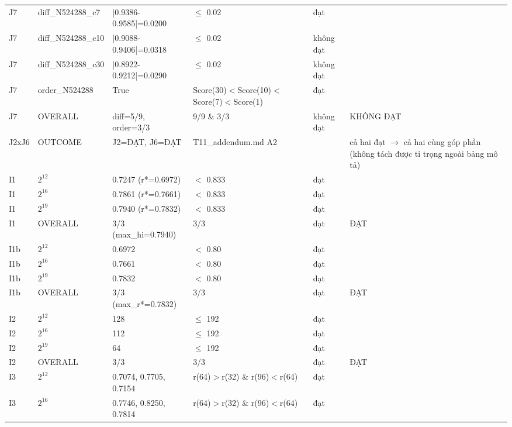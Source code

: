 \begin{longtable}{p{0.8cm}p{2.2cm}p{3.9cm}p{3.2cm}p{1.1cm}p{2.4cm}}
J7 & diff\_\allowbreak{}N524288\_\allowbreak{}c7 & |0.9386-0.9585|=\allowbreak{}0.0200 & $\le$\allowbreak{} 0.02 & đạt &  \\
J7 & diff\_\allowbreak{}N524288\_\allowbreak{}c10 & |0.9088-0.9406|=\allowbreak{}0.0318 & $\le$\allowbreak{} 0.02 & không đạt &  \\
J7 & diff\_\allowbreak{}N524288\_\allowbreak{}c30 & |0.8922-0.9212|=\allowbreak{}0.0290 & $\le$\allowbreak{} 0.02 & không đạt &  \\
J7 & order\_\allowbreak{}N524288 & True & Score(30)$<$\allowbreak{}Score(10)$<$\allowbreak{}Score(7)$<$\allowbreak{}Score(1) & đạt &  \\
J7 & OVERALL & diff=\allowbreak{}5/9, order=\allowbreak{}3/3 & 9/9 \& 3/3 & không đạt & KHÔNG ĐẠT \\
J2xJ6 & OUTCOME & J2=\allowbreak{}ĐẠT, J6=\allowbreak{}ĐẠT & T11\_\allowbreak{}addendum.md A2 &  & cả hai đạt $\to$ cả hai cùng góp phần (không tách được tỉ trọng ngoài bảng mô tả) \\
I1 & $2^{12}$ & 0.7247 (r*=\allowbreak{}0.6972) & $<$\allowbreak{} 0.833 & đạt &  \\
I1 & $2^{16}$ & 0.7861 (r*=\allowbreak{}0.7661) & $<$\allowbreak{} 0.833 & đạt &  \\
I1 & $2^{19}$ & 0.7940 (r*=\allowbreak{}0.7832) & $<$\allowbreak{} 0.833 & đạt &  \\
I1 & OVERALL & 3/3 (max\_\allowbreak{}hi=\allowbreak{}0.7940) & 3/3 & đạt & ĐẠT \\
I1b & $2^{12}$ & 0.6972 & $<$\allowbreak{} 0.80 & đạt &  \\
I1b & $2^{16}$ & 0.7661 & $<$\allowbreak{} 0.80 & đạt &  \\
I1b & $2^{19}$ & 0.7832 & $<$\allowbreak{} 0.80 & đạt &  \\
I1b & OVERALL & 3/3 (max\_\allowbreak{}r*=\allowbreak{}0.7832) & 3/3 & đạt & ĐẠT \\
I2 & $2^{12}$ & 128 & $\le$\allowbreak{} 192 & đạt &  \\
I2 & $2^{16}$ & 112 & $\le$\allowbreak{} 192 & đạt &  \\
I2 & $2^{19}$ & 64 & $\le$\allowbreak{} 192 & đạt &  \\
I2 & OVERALL & 3/3 & 3/3 & đạt & ĐẠT \\
I3 & $2^{12}$ & 0.7074, 0.7705, 0.7154 & r(64)$>$\allowbreak{}r(32) \& r(96)$<$\allowbreak{}r(64) & đạt &  \\
I3 & $2^{16}$ & 0.7746, 0.8250, 0.7814 & r(64)$>$\allowbreak{}r(32) \& r(96)$<$\allowbreak{}r(64) & đạt &  \\

\end{longtable}
